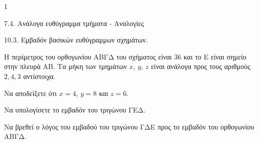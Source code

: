 \begin{ylh}{1}
    \item 7.4. Ανάλογα ευθύγραμμα τμήματα - Αναλογίες
    \item 10.3. Εμβαδόν βασικών ευθύγραμμων σχημάτων.
\end{ylh}
\begin{figure}
\centering
{}
\end{figure}
Η περίμετρος του ορθογωνίου ΑΒΓΔ του σχήματος είναι 36 και το Ε είναι σημείο στην πλευρά ΑΒ. Τα μήκη των τμημάτων $x$, $y$, $z$ είναι ανάλογα προς τους αριθμούς $2,4,3$ αντίστοιχα.
\begin{alist}
\item Να αποδείξετε ότι $x = 4$, $y = 8$ και $z = 6$. 
\item 
    \begin{rlist}
    \item Να υπολογίσετε το εμβαδόν του τριγώνου ΓΕΔ.
    \item Να βρεθεί ο λόγος του εμβαδού του τριγώνου ΓΔΕ προς το εμβαδόν του ορθογωνίου ΑΒΓΔ. 
    \end{rlist}
\end{alist}